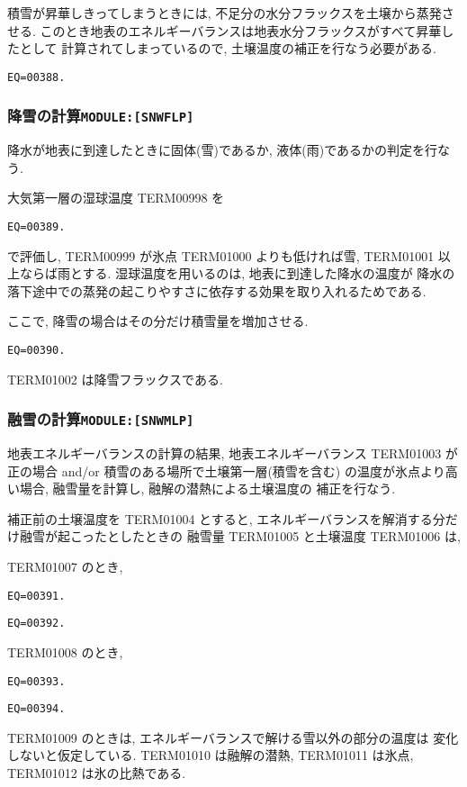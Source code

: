 積雪が昇華しきってしまうときには, 不足分の水分フラックスを土壌から蒸発させる. 
このとき地表のエネルギーバランスは地表水分フラックスがすべて昇華したとして
計算されてしまっているので, 土壌温度の補正を行なう必要がある. 
\begin{verbatim}
EQ=00388.
\end{verbatim}

\subsubsection{降雪の計算\texttt{MODULE:[SNWFLP]}}

降水が地表に到達したときに固体(雪)であるか, 液体(雨)であるかの判定を行なう. 

大気第一層の湿球温度 TERM00998 を
\begin{verbatim}
EQ=00389.
\end{verbatim}
で評価し, TERM00999 が氷点 TERM01000 よりも低ければ雪, TERM01001 以上ならば雨とする. 
湿球温度を用いるのは, 地表に到達した降水の温度が
降水の落下途中での蒸発の起こりやすさに依存する効果を取り入れるためである. 

ここで, 降雪の場合はその分だけ積雪量を増加させる. 
\begin{verbatim}
EQ=00390.
\end{verbatim}
TERM01002 は降雪フラックスである. 

\subsubsection{融雪の計算\texttt{MODULE:[SNWMLP]}}

地表エネルギーバランスの計算の結果, 地表エネルギーバランス TERM01003 が正の場合
 and/or 積雪のある場所で土壌第一層(積雪を含む)
の温度が氷点より高い場合, 融雪量を計算し, 融解の潜熱による土壌温度の
補正を行なう. 

補正前の土壌温度を TERM01004 とすると, 
エネルギーバランスを解消する分だけ融雪が起こったとしたときの
融雪量 TERM01005 と土壌温度 TERM01006 は, 

TERM01007 のとき, 
\begin{verbatim}
EQ=00391.
\end{verbatim}
\begin{verbatim}
EQ=00392.
\end{verbatim}
TERM01008 のとき, 
\begin{verbatim}
EQ=00393.
\end{verbatim}
\begin{verbatim}
EQ=00394.
\end{verbatim}
TERM01009 のときは, エネルギーバランスで解ける雪以外の部分の温度は
変化しないと仮定している. 
TERM01010 は融解の潜熱, TERM01011 は氷点, TERM01012 は氷の比熱である. 

